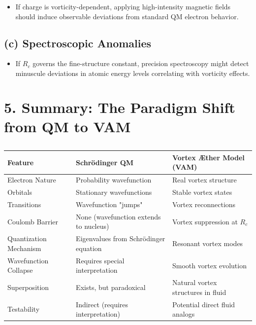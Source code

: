 \documentclass[a4paper,10pt]{article}
\begin{document}
\begin{itemize}
    \item If charge is vorticity-dependent, applying high-intensity magnetic fields should induce observable deviations from standard QM electron behavior.
\end{itemize}

\subsection*{(c) Spectroscopic Anomalies}

\begin{itemize}
    \item If \(R_c\) governs the fine-structure constant, precision spectroscopy might detect minuscule deviations in atomic energy levels correlating with vorticity effects.
\end{itemize}

\section*{5. Summary: The Paradigm Shift from QM to VAM}

\begin{table}[h]
    \centering
    \begin{tabular}{lll}
        \toprule
        \textbf{Feature} & \textbf{Schrödinger QM} & \textbf{Vortex Æther Model (VAM)} \\
        \midrule
        Electron Nature & Probability wavefunction & Real vortex structure \\
        Orbitals & Stationary wavefunctions & Stable vortex states \\
        Transitions & Wavefunction "jumps" & Vortex reconnections \\
        Coulomb Barrier & None (wavefunction extends to nucleus) & Vortex suppression at \(R_c\) \\
        Quantization Mechanism & Eigenvalues from Schrödinger equation & Resonant vortex modes \\
        Wavefunction Collapse & Requires special interpretation & Smooth vortex evolution \\
        Superposition & Exists, but paradoxical & Natural vortex structures in fluid \\
        Testability & Indirect (requires interpretation) & Potential direct fluid analogs \\
        \bottomrule
    \end{tabular}
    \caption{}
    \label{tab:QM-VAM-comparison}
\end{table}
\end{document}
